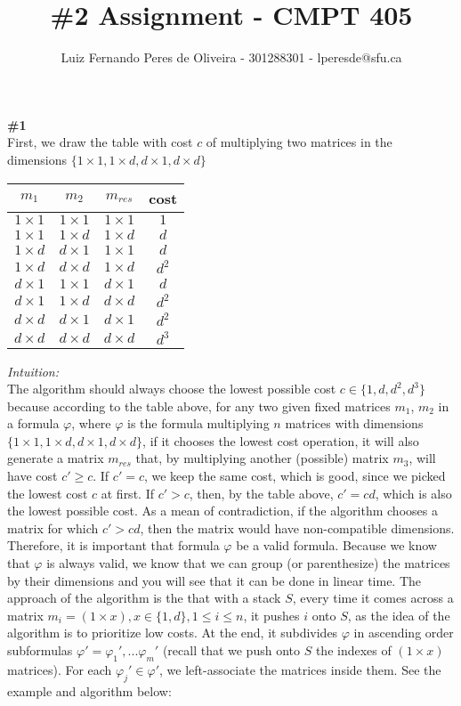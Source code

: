\documentclass{article}
\title{\#2 Assignment - CMPT 405}
\author{Luiz Fernando Peres de Oliveira - 301288301 - lperesde@sfu.ca}
\begin{document}
\maketitle
\textbf{\#1}
\\
First, we draw the table with cost $c$ of multiplying two matrices in the dimensions $\{ 1 \times 1, 1 \times d, d \times 1, d \times d\}$
\\
\begin{center}
\begin{tabular}{ |c|c|c|c| } 
 \hline
 $m_1$ & $m_2$ & $m_{res}$ & cost \\
 \hline
 $1 \times 1$ & $1 \times 1$ & $1 \times 1$ & $1$ \\
 \hline
 $1 \times 1$ & $1 \times d$ & $1 \times d$ & $d$ \\
 \hline
 $1 \times d$ & $d \times 1$ & $1 \times 1$ & $d$ \\
 \hline
 $1 \times d$ & $d \times d$ & $1 \times d$ & $d^2$ \\
 \hline
 $d \times 1$ & $1 \times 1$ & $d \times 1$ & $d$ \\
 \hline
 $d \times 1$ & $1 \times d$ & $d \times d$ & $d^2$ \\
 \hline
 $d \times d$ & $d \times 1$ & $d \times 1$ & $d^2$ \\
 \hline
 $d \times d$ & $d \times d$ & $d \times d$ & $d^3$ \\
 \hline
\end{tabular}
\end{center}
\textit{Intuition:}
\\
The algorithm should always choose the lowest possible cost $c \in \{1, d, d^2, d^3\}$ because according to the table above, for any two given fixed matrices $m_1$, $m_2$ in a formula $\varphi$, where $\varphi$ is the formula multiplying $n$ matrices with dimensions $\{ 1 \times 1, 1 \times d, d \times 1, d \times d\}$, if it chooses the lowest cost operation, it will also generate a matrix $m_{res}$ that, by multiplying another (possible) matrix $m_3$, will have cost $c' \geq c$. If $c' = c$, we keep the same cost, which is good, since we picked the lowest cost $c$ at first. If $c' > c$, then, by the table above, $c' = cd$, which is also the lowest possible cost. As a mean of contradiction, if the algorithm chooses a matrix for which $c' > cd$, then the matrix would have non-compatible dimensions. Therefore, it is important that formula $\varphi$ be a valid formula. Because we know that $\varphi$ is always valid, we know that we can group (or parenthesize) the matrices by their dimensions and you will see that it can be done in linear time. The approach of the algorithm is the that with a stack $S$, every time it comes across a matrix $m_i = (1 \times x), x \in \{ 1, d\}, 1 \leq i \leq n$, it pushes $i$ onto $S$, as the idea of the algorithm is to prioritize low costs. At the end, it subdivides $\varphi$ in ascending order subformulas $\varphi' = \varphi_1', ... \varphi_m'$ (recall that we push onto $S$ the indexes of $(1 \times x)$ matrices). For each $\varphi_j' \in \varphi'$, we left-associate the matrices inside them. See the example and algorithm below:
\end{document}
